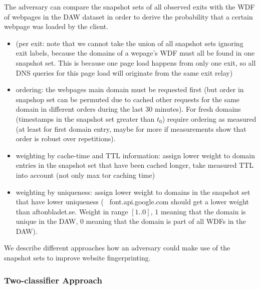 The adversary can compare the snapshot sets of all observed exits with
the WDF of webpages in
the DAW dataset in order to derive the probability that a certain
webpage was loaded by the client.

\begin{itemize}
  \item (per exit: note that we cannot take the union of all snapshot
		  sets ignoring exit labels, because the domains of a wepage's
		  WDF must all be found in one snapshot set. This is because one
		  page load happens from only one exit, so all DNS queries for
		  this page load will originate from the same exit relay)
  \item ordering: the webpages main domain must be requested first (but
		  order in snapshop set can be permuted due to cached other
		  requests for the same domain in different orders during the
		  last 30 minutes). For fresh domains (timestamps in the
		  snapshot set greater than $t_0$) require ordering as measured
		  (at least for first domain entry, maybe for more if
		  measurements show that order is robust over repetitions).
  \item weighting by cache-time and TTL information: assign lower weight to domain
		  entries in the snapshot set that have been cached longer, take
		  measured TTL into account (not only max tor caching time)
  \item weighting by uniqueness: assign lower weight to domains in the
		  snapshot set that have lower uniqueness (\eg~
		  font.api.google.com should get a lower weight than
		  aftonbladet.se. Weight in range $[1..0]$, $1$ meaning that
		  the domain is unique in the DAW, $0$ meaning that the domain
		  is part of all WDFs in the DAW). %
\end{itemize}

We describe different approaches how an adversary could make use of the
snapshot sets to improve website fingerprinting.

\subsubsection{Two-classifier Approach}

